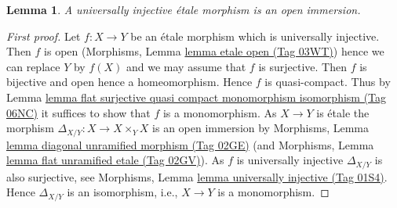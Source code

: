 \documentclass{amsart}
\theoremstyle{plain}
\newtheorem{lemma}[subsection]{Lemma}
\theoremstyle{definition}
\theoremstyle{remark}
\numberwithin{equation}{subsection}
\begin{document}
\begin{lemma}
\label{lemma-universally-injective-etale-open-immersion}
A universally injective \'etale morphism is an open immersion.
\end{lemma}

\begin{proof}[First proof]
Let $f : X \to Y$ be an \'etale morphism which is universally injective.
Then $f$ is open
(Morphisms, Lemma \href{https://stacks.math.columbia.edu/tag/03WT}{lemma etale open (Tag 03WT)})
hence we can replace $Y$ by $f(X)$ and we may assume that $f$ is surjective.
Then $f$ is bijective and open hence a homeomorphism. Hence $f$ is
quasi-compact. Thus by
Lemma \href{https://stacks.math.columbia.edu/tag/06NC}{lemma flat surjective quasi compact monomorphism isomorphism (Tag 06NC)}
it suffices to show that $f$ is a monomorphism. As $X \to Y$ is \'etale
the morphism $\Delta_{X/Y} : X \to X \times_Y X$ is an open immersion by
Morphisms, Lemma \href{https://stacks.math.columbia.edu/tag/02GE}{lemma diagonal unramified morphism (Tag 02GE)}
(and
Morphisms, Lemma \href{https://stacks.math.columbia.edu/tag/02GV}{lemma flat unramified etale (Tag 02GV)}).
As $f$ is universally injective $\Delta_{X/Y}$ is also surjective, see
Morphisms, Lemma \href{https://stacks.math.columbia.edu/tag/01S4}{lemma universally injective (Tag 01S4)}.
Hence $\Delta_{X/Y}$ is an isomorphism, i.e., $X \to Y$ is a monomorphism.
\end{proof}
\end{document}
